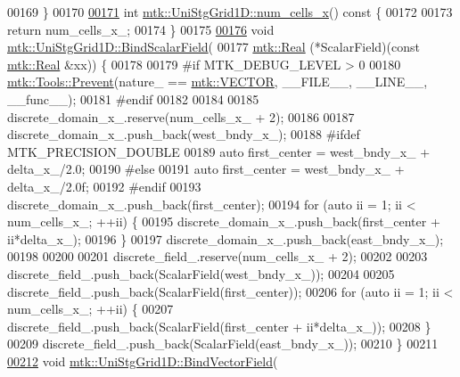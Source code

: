 \begin{DoxyCode}
00169 \}
00170 
\hypertarget{mtk__uni__stg__grid__1d_8cc_source_l00171}{}\hyperlink{classmtk_1_1UniStgGrid1D_af1b3729d8afa07be5b2775ed68015b80}{00171} \textcolor{keywordtype}{int} \hyperlink{classmtk_1_1UniStgGrid1D_af1b3729d8afa07be5b2775ed68015b80}{mtk::UniStgGrid1D::num\_cells\_x}()\textcolor{keyword}{ const }\{
00172 
00173   \textcolor{keywordflow}{return} num\_cells\_x\_;
00174 \}
00175 
\hypertarget{mtk__uni__stg__grid__1d_8cc_source_l00176}{}\hyperlink{classmtk_1_1UniStgGrid1D_ab49f0009b66b0a58ae7f70a538f4d12b}{00176} \textcolor{keywordtype}{void} \hyperlink{classmtk_1_1UniStgGrid1D_ab49f0009b66b0a58ae7f70a538f4d12b}{mtk::UniStgGrid1D::BindScalarField}(
00177     \hyperlink{group__c01-roots_gac080bbbf5cbb5502c9f00405f894857d}{mtk::Real} (*ScalarField)(\textcolor{keyword}{const} \hyperlink{group__c01-roots_gac080bbbf5cbb5502c9f00405f894857d}{mtk::Real} &xx)) \{
00178 
00179 \textcolor{preprocessor}{  #if MTK\_DEBUG\_LEVEL > 0}
00180   \hyperlink{classmtk_1_1Tools_a332324c6f25e66be9dff48c5987a3b9f}{mtk::Tools::Prevent}(nature\_ == \hyperlink{namespacemtk_ga4c54f2a329cfb4e56213b02a259d19e2a3d8cb27a993651a74d67fb8c98ae91b2}{mtk::VECTOR}, \_\_FILE\_\_, \_\_LINE\_\_, \_\_func\_\_);
00181 \textcolor{preprocessor}{  #endif}
00182 
00184 
00185   discrete\_domain\_x\_.reserve(num\_cells\_x\_ + 2);
00186 
00187   discrete\_domain\_x\_.push\_back(west\_bndy\_x\_);
00188 \textcolor{preprocessor}{  #ifdef MTK\_PRECISION\_DOUBLE}
00189   \textcolor{keyword}{auto} first\_center = west\_bndy\_x\_ + delta\_x\_/2.0;
00190 \textcolor{preprocessor}{  #else}
00191   \textcolor{keyword}{auto} first\_center = west\_bndy\_x\_ + delta\_x\_/2.0f;
00192 \textcolor{preprocessor}{  #endif}
00193   discrete\_domain\_x\_.push\_back(first\_center);
00194   \textcolor{keywordflow}{for} (\textcolor{keyword}{auto} ii = 1; ii < num\_cells\_x\_; ++ii) \{
00195     discrete\_domain\_x\_.push\_back(first\_center + ii*delta\_x\_);
00196   \}
00197   discrete\_domain\_x\_.push\_back(east\_bndy\_x\_);
00198 
00200 
00201   discrete\_field\_.reserve(num\_cells\_x\_ + 2);
00202 
00203   discrete\_field\_.push\_back(ScalarField(west\_bndy\_x\_));
00204 
00205   discrete\_field\_.push\_back(ScalarField(first\_center));
00206   \textcolor{keywordflow}{for} (\textcolor{keyword}{auto} ii = 1; ii < num\_cells\_x\_; ++ii) \{
00207     discrete\_field\_.push\_back(ScalarField(first\_center + ii*delta\_x\_));
00208   \}
00209   discrete\_field\_.push\_back(ScalarField(east\_bndy\_x\_));
00210 \}
00211 
\hypertarget{mtk__uni__stg__grid__1d_8cc_source_l00212}{}\hyperlink{classmtk_1_1UniStgGrid1D_a5703f1f875f52f6de8f7db5a6250fafa}{00212} \textcolor{keywordtype}{void} \hyperlink{classmtk_1_1UniStgGrid1D_a5703f1f875f52f6de8f7db5a6250fafa}{mtk::UniStgGrid1D::BindVectorField}(

\end{DoxyCode}
